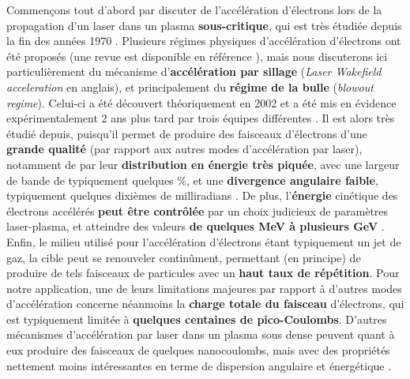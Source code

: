 \begin{refsection}
Commençons tout d'abord par discuter de l'accélération d'électrons lors de la propagation d'un laser dans un plasma \textbf{sous-critique}, qui est très étudiée depuis la fin des années 1970 \parencite{tajima_1979}. Plusieurs régimes physiques d'accélération d'électrons ont été proposés (une revue est disponible en référence \parencite{esarey_2009}), mais nous discuterons ici particulièrement du mécanisme d'\textbf{accélération par sillage} (\textit{Laser Wakefield acceleration} en anglais), et principalement du \textbf{régime de la bulle} (\textit{blowout regime}). Celui-ci a été découvert théoriquement en 2002 \parencite{pukhov_2002} et a été mis en évidence expérimentalement 2 ans plus tard par trois équipes différentes \parencite{faure_2004, geddes_2004, mangles_2004}. Il est alors très étudié depuis, puisqu'il permet de produire des faisceaux d'électrons d'une \textbf{grande qualité} (par rapport aux autres modes d'accélération par laser), notamment de par leur \textbf{distribution en énergie très piquée}, avec une largeur de bande de typiquement quelques \%, et une \textbf{divergence angulaire faible}, typiquement quelques dixièmes de milliradians \parencite{esarey_2009}. De plus, l'\textbf{énergie} cinétique des électrons accélérés \textbf{peut être contrôlée} par un choix judicieux de paramètres laser-plasma, et atteindre des valeurs \textbf{de quelques MeV à plusieurs GeV} \parencite{faure_2019, leemans_2006, gonsalves_2019}. Enfin, le milieu utilisé pour l'accélération d'électrons étant typiquement un jet de gaz, la cible peut se renouveler continûment, permettant (en principe) de produire de tels faisceaux de particules avec un \textbf{haut taux de répétition}. Pour notre application, une de leurs limitations majeures par rapport à d'autres modes d'accélération concerne néanmoins la \textbf{charge totale du faisceau} d'électrons, qui est typiquement limitée à \textbf{quelques centaines de pico-Coulombs}. D'autres mécanismes d'accélération par laser dans un plasma sous dense peuvent quant à eux produire des faisceaux de quelques nanocoulombs, mais avec des propriétés nettement moins intéressantes en terme de dispersion angulaire et énergétique \parencite{esarey_2009}. 


\end{refsection}

